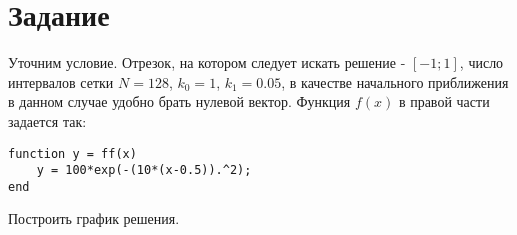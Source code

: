 \section{Задание}
Уточним условие. Отрезок, на котором следует искать решение - $[-1; 1]$, число интервалов сетки $N = 128$, $k_0 = 1$, $k_1 = 0.05$, в качестве начального приближения в данном случае удобно брать нулевой вектор. Функция $f(x)$ в правой части задается так:
\begin{matlablisting}
	\begin{verbatim}
function y = ff(x)
    y = 100*exp(-(10*(x-0.5)).^2);
end
	\end{verbatim}
\end{matlablisting}
Построить график решения.